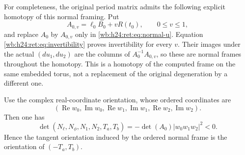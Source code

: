 For completeness, the original period matrix admits the following
explicit homotopy of this normal framing.  Put
\begin{equation}
 A_{0,v}=\ell_0B_0+vR(t_0),\qquad 0\leq v\leq1,
 \label{wb:h24:ret:eq:A-homotopy}
\end{equation}
and replace \(A_0\) by \(A_{0,v}\) only in
\eqref{wb:h24:ret:eq:normal-u}.  Equation \eqref{wb:h24:ret:eq:invertibility} proves
invertibility for every \(v\).  Their images under the actual
\((du_1,du_2)\) are the columns of \(A_0^{-1}A_{0,v}\), so these
are normal frames throughout the homotopy.  This is a homotopy of
the computed frame on the same embedded torus, not a replacement of
the original degeneration by a different one.

\begin{lemma}\label{wb:h24:ret:orientation-lemma}

Use the complex real-coordinate orientation, whose ordered coordinates are
\[
 (\operatorname{Re}w_0,\operatorname{Im}w_0,
  \operatorname{Re}w_1,\operatorname{Im}w_1,
  \operatorname{Re}w_2,\operatorname{Im}w_2).
\]
Then one has
\begin{equation}
 \det(N_\ell,N_\phi,N_1,N_2,T_a,T_b)
       =-\det(A_0)|w_0w_1w_2|^2<0.
 \label{wb:h24:ret:eq:sign}
\end{equation}
Hence the tangent orientation induced by the ordered normal frame is
the orientation of \((-T_a,T_b)\).
\end{lemma}


